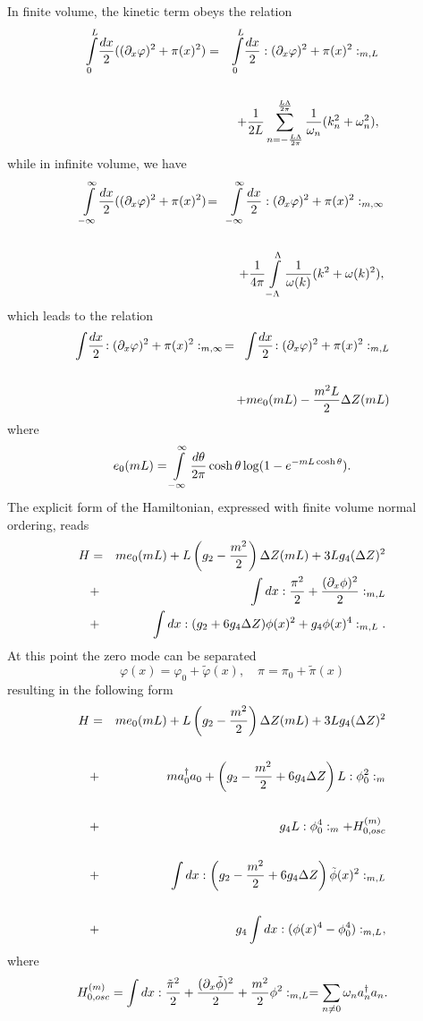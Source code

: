 \documentclass[twocolumn,secnumarabic,amssymb, nobibnotes, aps, prd]{revtex4-2}
\newcommand{\be}{\begin{equation}}
\newcommand{\ee}{\end{equation}}
\newcommand{\bea}{\begin{eqnarray}}
\newcommand{\eea}{\end{eqnarray}}
\begin{document}
In finite volume, the kinetic term obeys the relation
\bea
\intop_0^L\!\frac{dx}{2}((\partial_x \varphi)^2+\pi(x)^2) &=& \intop_0^L \! \frac{dx}{2}:(\partial_x \varphi)^2+\pi(x)^2:_{m,L}\cr\cr 
&&\hskip -.5in +
\frac{1}{2L}\sum_{n=-\frac{L\Lambda}{2\pi}}^{\frac{L\Lambda}{2\pi}}\frac{1}{\omega_n}(k_n^2+\omega_n^2),
\eea
while in infinite volume, we have
\bea
\intop_{-\infty}^\infty\!\frac{dx}{2}((\partial_x \varphi)^2+\pi(x)^2) \!&=&\!
\intop_{-\infty}^\infty\!\frac{dx}{2}:(\partial_x \varphi)^2+\pi(x)^2:_{m,\infty}\cr\cr 
&&\hskip -.5in +
\frac{1}{4\pi}\intop_{-\Lambda}^{\Lambda}\frac{1}{\omega(k)}(k^2+\omega(k)^2),
\eea
which leads to the relation
\bea
\intop\!\frac{dx}{2}\!:(\partial_x \varphi)^2+\pi(x)^2:_{m,\infty}
\!&=&\!\intop\!\frac{dx}{2}\! :(\partial_x \varphi)^2+\pi(x)^2:_{m,L}\cr\cr 
&&\hskip -.75in +me_0(mL)-\frac{m^2L}{2}\Delta Z(mL)
\eea
where
\be
e_0(mL)=\intop_{-\infty}^{\infty} \frac{d\theta}{2\pi}\cosh\theta\log(1-e^{-mL\cosh\theta}). \label{e0funcdef}
\ee
The explicit form of the Hamiltonian, expressed with finite volume normal ordering,
reads
\bea
H&=&me_0(mL)+L\left(g_2-\frac{m^2}{2}\right)\Delta Z(mL)+ 3Lg_4(\Delta Z)^2\nonumber\\
&+&\intop dx :\frac{\pi^2}{2}+\frac{(\partial_x \phi)^2}{2}:_{m,L}\nonumber\\
&+&\intop dx:(g_2+6g_4\Delta Z) \phi(x)^2+g_4 \phi(x)^4:_{m,L}.
\eea
At this point the zero mode can be separated
\be
\varphi(x)=\varphi_0+\tilde{\varphi}(x),\quad \pi=\pi_0+\tilde{\pi}(x)
\ee
resulting in the following form
\bea
H&=&me_0(mL)+L\left(g_2-\frac{m^2}{2}\right)\Delta Z(mL)+ 3Lg_4(\Delta Z)^2\cr\cr
&+&m a_0^\dagger a_0+\left(g_2-\frac{m^2}{2}+6g_4\Delta Z\right)L :\phi_0^2:_m\cr\cr
&+&g_4 L :\phi_0^4:_m+H_{0,osc}^{(m)}\cr\cr 
&+&\intop dx :\left(g_2-\frac{m^2}{2}+6g_4\Delta Z\right) \tilde\phi(x)^2:_{m,L}\cr\cr 
&+& g_4 \intop dx :(\phi(x)^4-\phi_0^4):_{m,L},
\eea
where
\be
H_{0,osc}^{(m)}=\intop dx :\frac{\tilde\pi^2}{2}+\frac{(\partial_x \tilde\phi)^2}{2}+\frac{m^2}{2}\phi^2:_{m,L}=\sum_{n\neq 0} \omega_n a_n^\dagger a_n.
\ee
\end{document}
